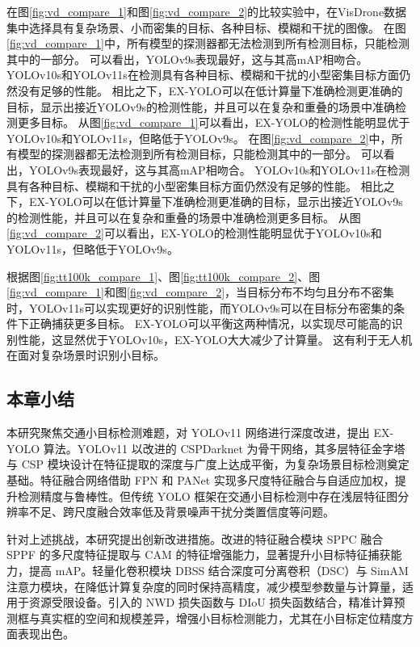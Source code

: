 在图\ref{fig:vd_compare_1}和图\ref{fig:vd_compare_2}的比较实验中，在VisDrone数据集中选择具有复杂场景、小而密集的目标、各种目标、模糊和干扰的图像。
在图\ref{fig:vd_compare_1}中，所有模型的探测器都无法检测到所有检测目标，只能检测其中的一部分。 可以看出，YOLOv9s表现最好，这与其高mAP相吻合。 YOLOv10s和YOLOv11s在检测具有各种目标、模糊和干扰的小型密集目标方面仍然没有足够的性能。 相比之下，EX-YOLO可以在低计算量下准确检测更准确的目标，显示出接近YOLOv9s的检测性能，并且可以在复杂和重叠的场景中准确检测更多目标。 从图\ref{fig:vd_compare_1}可以看出，EX-YOLO的检测性能明显优于YOLOv10s和YOLOv11s，但略低于YOLOv9s。
在图\ref{fig:vd_compare_2}中，所有模型的探测器都无法检测到所有检测目标，只能检测其中的一部分。 可以看出，YOLOv9s表现最好，这与其高mAP相吻合。 YOLOv10s和YOLOv11s在检测具有各种目标、模糊和干扰的小型密集目标方面仍然没有足够的性能。 相比之下，EX-YOLO可以在低计算量下准确检测更准确的目标，显示出接近YOLOv9s的检测性能，并且可以在复杂和重叠的场景中准确检测更多目标。 从图\ref{fig:vd_compare_2}可以看出，EX-YOLO的检测性能明显优于YOLOv10s和YOLOv11s，但略低于YOLOv9s。

根据图\ref{fig:tt100k_compare_1}、图\ref{fig:tt100k_compare_2}、图\ref{fig:vd_compare_1}和图\ref{fig:vd_compare_2}，当目标分布不均匀且分布不密集时，YOLOv11s可以实现更好的识别性能，而YOLOv9s可以在目标分布密集的条件下正确捕获更多目标。 EX-YOLO可以平衡这两种情况，以实现尽可能高的识别性能，这显然优于YOLOv10s，EX-YOLO大大减少了计算量。 这有利于无人机在面对复杂场景时识别小目标。

\subsection{本章小结}

本研究聚焦交通小目标检测难题，对 YOLOv11 网络进行深度改进，提出 EX-YOLO 算法。YOLOv11 以改进的 CSPDarknet 为骨干网络，其多层特征金字塔与 CSP 模块设计在特征提取的深度与广度上达成平衡，为复杂场景目标检测奠定基础。特征融合网络借助 FPN 和 PANet 实现多尺度特征融合与自适应加权，提升检测精度与鲁棒性。但传统 YOLO 框架在交通小目标检测中存在浅层特征图分辨率不足、跨尺度融合效率低及背景噪声干扰分类置信度等问题。

针对上述挑战，本研究提出创新改进措施。改进的特征融合模块 SPPC 融合 SPPF 的多尺度特征提取与 CAM 的特征增强能力，显著提升小目标特征捕获能力，提高 mAP。轻量化卷积模块 DBSS 结合深度可分离卷积（DSC）与 SimAM 注意力模块，在降低计算复杂度的同时保持高精度，减少模型参数量与计算量，适用于资源受限设备。引入的 NWD 损失函数与 DIoU 损失函数结合，精准计算预测框与真实框的空间和规模差异，增强小目标检测能力，尤其在小目标定位精度方面表现出色。

